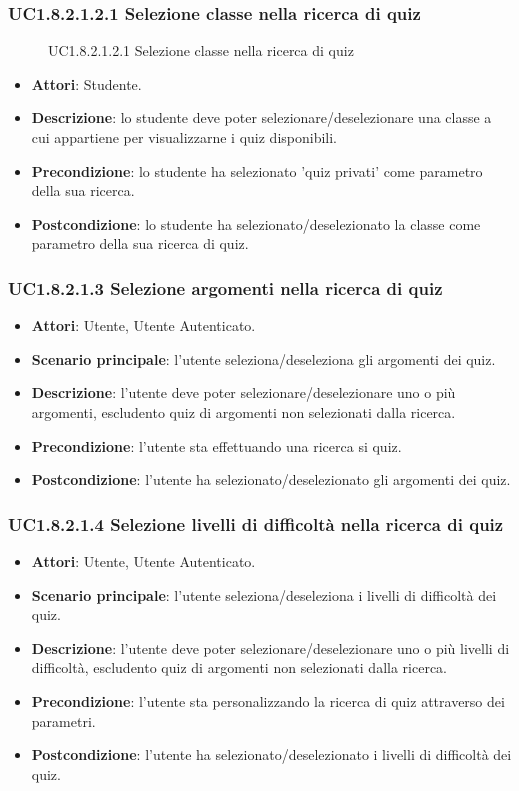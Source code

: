 \subsubsection{UC1.8.2.1.2.1 Selezione classe nella ricerca di quiz}
\begin{figure}[H]
\centering
\noindent{}
\caption{UC1.8.2.1.2.1 Selezione classe nella ricerca di quiz}
\end{figure}
\begin{itemize}
\item \textbf{Attori}: Studente.
\item \textbf{Descrizione}: lo studente deve poter selezionare/deselezionare una classe a cui appartiene per visualizzarne i quiz disponibili.
\item \textbf{Precondizione}: lo studente ha selezionato 'quiz privati' come parametro della sua ricerca.
\item \textbf{Postcondizione}: lo studente ha selezionato/deselezionato la classe come parametro della sua ricerca di quiz.
\end{itemize}
\subsubsection{UC1.8.2.1.3 Selezione argomenti nella ricerca di quiz}
\begin{itemize}
\item \textbf{Attori}: Utente, Utente Autenticato.
\item \textbf{Scenario principale}: l'utente seleziona/deseleziona gli argomenti dei quiz.
\item \textbf{Descrizione}: l'utente deve poter selezionare/deselezionare uno o più argomenti, escludento quiz di argomenti non selezionati dalla ricerca.
\item \textbf{Precondizione}: l'utente sta effettuando una ricerca si quiz.
\item \textbf{Postcondizione}: l'utente ha selezionato/deselezionato gli argomenti dei quiz.
\end{itemize}
\subsubsection{UC1.8.2.1.4 Selezione livelli di difficoltà nella ricerca di quiz}
\begin{itemize}
\item \textbf{Attori}: Utente, Utente Autenticato.
\item \textbf{Scenario principale}: l'utente seleziona/deseleziona i livelli di difficoltà dei quiz.
\item \textbf{Descrizione}: l'utente deve poter selezionare/deselezionare uno o più livelli di difficoltà, escludento quiz di argomenti non selezionati dalla ricerca.
\item \textbf{Precondizione}: l'utente sta personalizzando la ricerca di quiz attraverso dei parametri.
\item \textbf{Postcondizione}: l'utente ha selezionato/deselezionato i livelli di difficoltà dei quiz.
\end{itemize}
